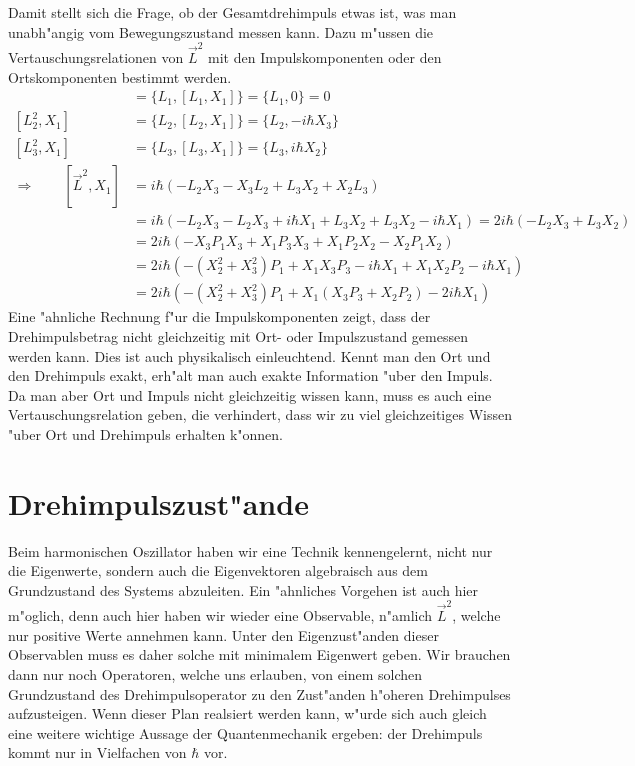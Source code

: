 Damit stellt sich die Frage, ob der Gesamtdrehimpuls etwas ist,
was man unabh"angig vom Bewegungszustand messen kann.
Dazu m"ussen die Vertauschungsrelationen von $\vec L^2$ mit den
Impulskomponenten oder den Ortskomponenten bestimmt werden.
\begin{align*}
[L_1^2,X_1]
&=
\{L_1,[L_1,X_1]\}
=\{L_1,0\}=0
\\
[L_2^2,X_1]
&=
\{L_2,[L_2,X_1]\}
=
\{L_2,-i\hbar X_3\}
\\
[L_3^2,X_1]
&=
\{L_3,[L_3,X_1]\}
=
\{L_3, i\hbar X_2\}
\\
\Rightarrow\qquad
[\vec L^2,X_1]
&=
i\hbar(-L_2X_3-X_3L_2+L_3X_2+X_2L_3)
\\
&=
i\hbar(-L_2X_3-L_2X_3+i\hbar X_1 +L_3X_2+L_3X_2-i\hbar X_1)
=
2i\hbar(-L_2X_3 +L_3X_2)
\\
&=
2i\hbar(
-X_3P_1X_3+X_1P_3X_3+X_1P_2X_2-X_2P_1X_2
)
\\
&=
2i\hbar(
-(X_2^2+X_3^2)P_1+X_1X_3P_3-i\hbar X_1+ X_1X_2P_2-i\hbar X_1
)
\\
&=
2i\hbar(
-(X_2^2+X_3^2)P_1
+X_1(X_3P_3 + X_2P_2)
-2i\hbar X_1
)
\end{align*}
Eine "ahnliche Rechnung f"ur die Impulskomponenten zeigt, dass der
Drehimpulsbetrag nicht gleichzeitig mit Ort- oder Impulszustand
gemessen werden kann.
Dies ist auch physikalisch einleuchtend.
Kennt man den Ort und den Drehimpuls exakt, erh"alt man auch exakte
Information "uber den Impuls.
Da man aber Ort und Impuls nicht gleichzeitig wissen kann, muss es auch
eine Vertauschungsrelation geben, die verhindert, dass wir zu viel
gleichzeitiges Wissen "uber Ort und Drehimpuls erhalten k"onnen.

\section{Drehimpulszust"ande\label{section:drehimpulszustaende}}
Beim harmonischen Oszillator haben wir eine Technik kennengelernt, nicht
nur die Eigenwerte, sondern auch die Eigenvektoren algebraisch aus dem
Grundzustand des Systems abzuleiten.
Ein "ahnliches Vorgehen ist auch hier m"oglich, denn auch hier haben wir
wieder eine Observable, n"amlich $\vec L^2$, welche nur positive
Werte annehmen kann.
Unter den Eigenzust"anden dieser Observablen muss es daher solche mit
minimalem Eigenwert geben.
Wir brauchen dann nur noch Operatoren, welche uns erlauben, von einem
solchen Grundzustand des Drehimpulsoperator zu den Zust"anden 
h"oheren Drehimpulses aufzusteigen.
Wenn dieser Plan realsiert werden kann, w"urde sich auch gleich
eine weitere wichtige Aussage der Quantenmechanik ergeben: der Drehimpuls
kommt nur in Vielfachen von $\hbar$ vor.

